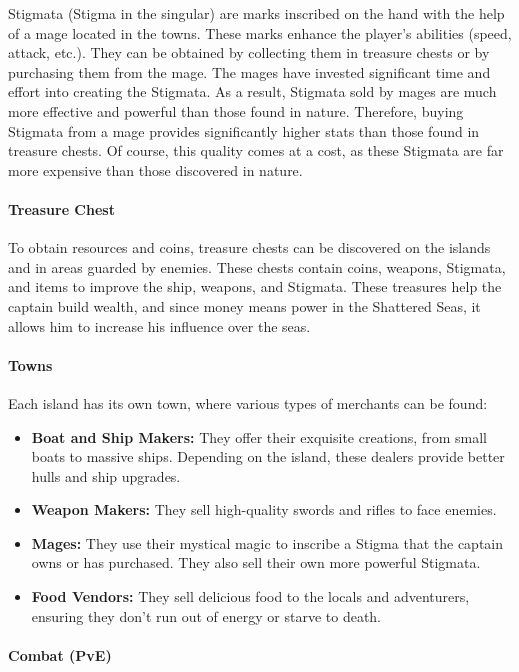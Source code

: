 \documentclass{article}
\begin{document}
Stigmata (Stigma in the singular) are marks inscribed on the hand with the help of a mage located in the towns. These marks enhance the player's abilities (speed, attack, etc.). They can be obtained by collecting them in treasure chests or by purchasing them from the mage. The mages have invested significant time and effort into creating the Stigmata. As a result, Stigmata sold by mages are much more effective and powerful than those found in nature. Therefore, buying Stigmata from a mage provides significantly higher stats than those found in treasure chests. Of course, this quality comes at a cost, as these Stigmata are far more expensive than those discovered in nature.

\paragraph{Treasure Chest}\hfill

To obtain resources and coins, treasure chests can be discovered on the islands and in areas guarded by enemies. These chests contain coins, weapons, Stigmata, and items to improve the ship, weapons, and Stigmata. These treasures help the captain build wealth, and since money means power in the Shattered Seas, it allows him to increase his influence over the seas.

\paragraph{Towns}\hfill

Each island has its own town, where various types of merchants can be found:
\begin{itemize}
    \item \textbf{Boat and Ship Makers:} They offer their exquisite creations, from small boats to massive ships. Depending on the island, these dealers provide better hulls and ship upgrades.
    \item \textbf{Weapon Makers:} They sell high-quality swords and rifles to face enemies.
    \item \textbf{Mages:} They use their mystical magic to inscribe a Stigma that the captain owns or has purchased. They also sell their own more powerful Stigmata.
    \item \textbf{Food Vendors:} They sell delicious food to the locals and adventurers, ensuring they don’t run out of energy or starve to death.
\end{itemize}

\paragraph{Combat (PvE)}\hfill
\end{document}
